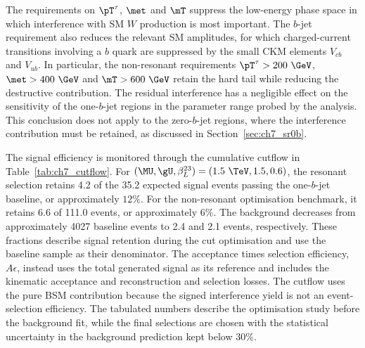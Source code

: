 The requirements on $\pT^\tau$, $\met$ and $\mT$ suppress the low-energy phase space in which interference with SM $W$ production is most important.
The $b$-jet requirement also reduces the relevant SM amplitudes, for which charged-current transitions involving a $b$ quark are suppressed by the small CKM elements $V_{cb}$ and $V_{ub}$.
In particular, the non-resonant requirements $\pT^\tau>200~\GeV$, $\met>400~\GeV$ and $\mT>600~\GeV$ retain the hard tail while reducing the destructive contribution.
The residual interference has a negligible effect on the sensitivity of the one-$b$-jet regions in the parameter range probed by the analysis.
This conclusion does not apply to the zero-$b$-jet regions, where the interference contribution must be retained, as discussed in Section~\ref{sec:ch7_sr0b}.

The signal efficiency is monitored through the cumulative cutflow in Table~\ref{tab:ch7_cutflow}.
For $(\MU,\gU,\beta_L^{23})=(1.5~\TeV,1.5,0.6)$, the resonant selection retains 4.2 of the 35.2 expected signal events passing the one-$b$-jet baseline, or approximately $12\%$.
For the non-resonant optimisation benchmark, it retains 6.6 of 111.0 events, or approximately $6\%$.
The background decreases from approximately 4027 baseline events to 2.4 and 2.1 events, respectively.
These fractions describe signal retention during the cut optimisation and use the baseline sample as their denominator.
The acceptance times selection efficiency, $A\epsilon$, instead uses the total generated signal as its reference and includes the kinematic acceptance and reconstruction and selection losses.
The cutflow uses the pure BSM contribution because the signed interference yield is not an event-selection efficiency.
The tabulated numbers describe the optimisation study before the background fit, while the final selections are chosen with the statistical uncertainty in the background prediction kept below $30\%$.

